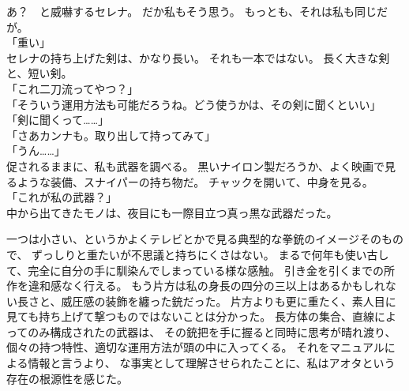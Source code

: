 \documentclass[../IHMain]{subfiles}
\begin{document}
あ？　と威嚇するセレナ。
だか私もそう思う。
もっとも、それは私も同じだが。\\
「重い」\\
セレナの持ち上げた剣は、かなり長い。
それも一本ではない。
長く大きな剣と、短い剣。\\
「これ二刀流ってやつ？」\\
「そういう運用方法も可能だろうね。どう使うかは、その剣に聞くといい」\\
「剣に聞くって……」\\
「さあカンナも。取り出して持ってみて」\\
「うん……」\\
促されるままに、私も武器を調べる。
黒いナイロン製だろうか、よく映画で見るような装備、スナイパーの持ち物だ。
チャックを開いて、中身を見る。\\
「これが私の武器？」\\
中から出てきたモノは、夜目にも一際目立つ真っ黒な武器だった。

一つは小さい、というかよくテレビとかで見る典型的な拳銃のイメージそのもので、
ずっしりと重たいが不思議と持ちにくさはない。
まるで何年も使い古して、完全に自分の手に馴染んでしまっている様な感触。
引き金を引くまでの所作を違和感なく行える。
もう片方は私の身長の四分の三以上はあるかもしれない長さと、威圧感の装飾を纏った銃だった。
片方よりも更に重たく、素人目に見ても持ち上げて撃つものではないことは分かった。
長方体の集合、直線によってのみ構成されたの武器は、
その銃把を手に握ると同時に思考が晴れ渡り、
個々の持つ特性、適切な運用方法が頭の中に入ってくる。
それをマニュアルによる情報と言うより、
な事実として理解させられたことに、私はアオタという存在の根源性を感じた。
\end{document}
